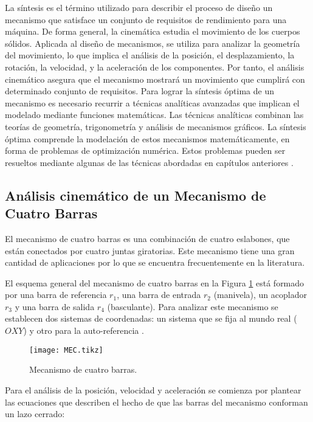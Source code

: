  La síntesis es el término utilizado para describir el proceso de diseño un mecanismo que satisface un conjunto de requisitos de rendimiento para una máquina. De forma general, la cinemática estudia el movimiento de los cuerpos sólidos. Aplicada al diseño de mecanismos, se utiliza para analizar la geometría del movimiento, lo que implica el análisis de la posición, el desplazamiento, la rotación, la velocidad, y la aceleración de los componentes. Por tanto, el análisis cinemático asegura que el mecanismo mostrará un movimiento que cumplirá con determinado conjunto de requisitos. Para lograr la síntesis óptima de un mecanismo es necesario recurrir a técnicas analíticas avanzadas que implican el modelado mediante funciones matemáticas. Las técnicas analíticas combinan las teorías de geometría, trigonometría y análisis de mecanismos gráficos. La síntesis óptima comprende la modelación de estos mecanismos matemáticamente, en forma de problemas de optimización numérica. Estos problemas pueden ser resueltos mediante algunas de las técnicas abordadas en capítulos anteriores \cite{myszka2004machines}. 


\subsection{Análisis cinemático de un Mecanismo de Cuatro Barras}\label{sec:Análisis cinemático de un Mecanismo de Cuatro Barras}
El mecanismo de cuatro barras es una combinación de cuatro eslabones, que están conectados por cuatro juntas giratorias. Este mecanismo tiene una gran cantidad de aplicaciones por lo que se encuentra frecuentemente en la literatura. 


El esquema general del mecanismo de cuatro barras en la Figura \ref{fig:MEC} está formado por una barra de referencia $r_1$, una barra de entrada $r_2$ (manivela), un acoplador $r_3$ y una barra de salida $r_4$ (basculante). Para analizar este mecanismo se establecen dos sistemas de coordenadas: un sistema que se fija al mundo real ($OXY$) y otro para la auto-referencia \cite{herne1_two_swim_2016}.

\begin{figure}[htb]
    \centering
    \resizebox {\textwidth} {\height} {
     \texttt{[image: MEC.tikz]}
     }
    \caption{Mecanismo de cuatro barras.}
    \label{fig:MEC}
\end{figure}
Para el análisis de la posición, velocidad y aceleración se comienza por plantear las ecuaciones que describen el hecho de que las barras del mecanismo conforman un lazo cerrado:

